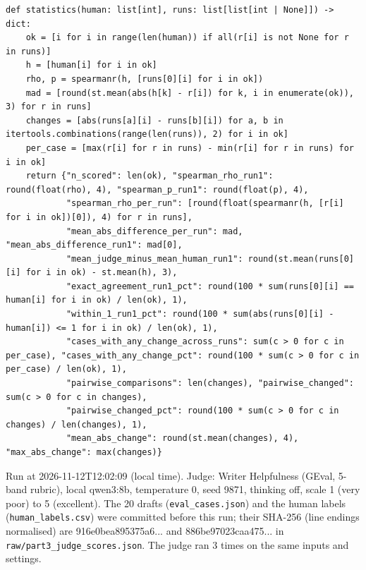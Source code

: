 \documentclass[11pt]{article}
\begin{document}
\begingroup\lstset{basicstyle=\ttfamily\tiny}
\begin{lstlisting}
def statistics(human: list[int], runs: list[list[int | None]]) -> dict:
    ok = [i for i in range(len(human)) if all(r[i] is not None for r in runs)]
    h = [human[i] for i in ok]
    rho, p = spearmanr(h, [runs[0][i] for i in ok])
    mad = [round(st.mean(abs(h[k] - r[i]) for k, i in enumerate(ok)), 3) for r in runs]
    changes = [abs(runs[a][i] - runs[b][i]) for a, b in itertools.combinations(range(len(runs)), 2) for i in ok]
    per_case = [max(r[i] for r in runs) - min(r[i] for r in runs) for i in ok]
    return {"n_scored": len(ok), "spearman_rho_run1": round(float(rho), 4), "spearman_p_run1": round(float(p), 4),
            "spearman_rho_per_run": [round(float(spearmanr(h, [r[i] for i in ok])[0]), 4) for r in runs],
            "mean_abs_difference_per_run": mad, "mean_abs_difference_run1": mad[0],
            "mean_judge_minus_mean_human_run1": round(st.mean(runs[0][i] for i in ok) - st.mean(h), 3),
            "exact_agreement_run1_pct": round(100 * sum(runs[0][i] == human[i] for i in ok) / len(ok), 1),
            "within_1_run1_pct": round(100 * sum(abs(runs[0][i] - human[i]) <= 1 for i in ok) / len(ok), 1),
            "cases_with_any_change_across_runs": sum(c > 0 for c in per_case), "cases_with_any_change_pct": round(100 * sum(c > 0 for c in per_case) / len(ok), 1),
            "pairwise_comparisons": len(changes), "pairwise_changed": sum(c > 0 for c in changes),
            "pairwise_changed_pct": round(100 * sum(c > 0 for c in changes) / len(changes), 1),
            "mean_abs_change": round(st.mean(changes), 4), "max_abs_change": max(changes)}
\end{lstlisting}
\endgroup
Run at 2026-11-12T12:02:09 (local time). Judge: Writer Helpfulness (GEval, 5-band rubric), local qwen3:8b, temperature 0, seed 9871, thinking off, scale 1 (very poor) to 5 (excellent). The 20 drafts (\texttt{eval\_\allowbreak{}cases.json}) and the human labels (\texttt{human\_\allowbreak{}labels.csv}) were committed before this run; their SHA-256 (line endings normalised) are 916e0bea895375a6... and 886be97023caa475... in \texttt{raw/\allowbreak{}part3\_\allowbreak{}judge\_\allowbreak{}scores.json}. The judge ran 3 times on the same inputs and settings.
\end{document}
